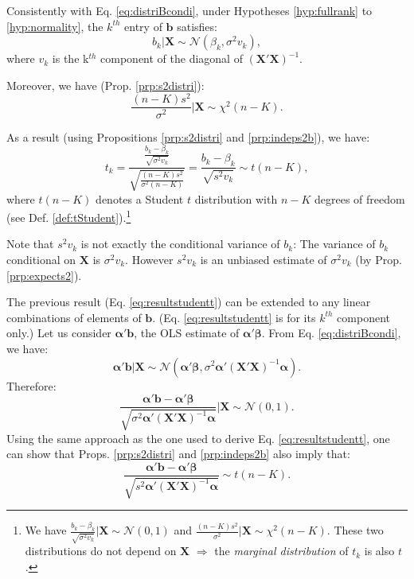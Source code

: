\documentclass[
  12pt,
]{book}
\theoremstyle{definition}
\theoremstyle{definition}
\theoremstyle{definition}
\theoremstyle{definition}
\theoremstyle{remark}
\begin{document}
Consistently with Eq. \eqref{eq:distriBcondi}, under Hypotheses \ref{hyp:fullrank} to \ref{hyp:normality}, the \(k^{th}\) entry of \(\mathbf{b}\) satisfies:
\[
b_k | \mathbf{X} \sim \mathcal{N}(\beta_k,\sigma^2 v_k),
\]
where \(v_k\) is the k\(^{th}\) component of the diagonal of \((\mathbf{X}'\mathbf{X})^{-1}\).

Moreover, we have (Prop. \ref{prp:s2distri}):
\[
\frac{(n-K)s^2}{\sigma^2} | \mathbf{X} \sim \chi ^2 (n-K).
\]

As a result (using Propositions \ref{prp:s2distri} and \ref{prp:indeps2b}), we have:
\begin{equation}
\boxed{t_k = \frac{\frac{b_k - \beta_k}{\sqrt{\sigma^2 v_k}}}{\sqrt{\frac{(n-K)s^2}{\sigma^2(n-K)}}} = \frac{b_k - \beta_k}{\sqrt{s^2v_k}} \sim t(n-K),}\label{eq:resultstudentt}
\end{equation}
where \(t(n-K)\) denotes a Student \(t\) distribution with \(n-K\) degrees of freedom (see Def. \ref{def:tStudent}).\footnote{We have \(\frac{b_k - \beta_k}{\sqrt{\sigma^2 v_k}} | \mathbf{X} \sim \mathcal{N}(0,1)\) and \(\frac{(n-K)s^2}{\sigma^2} | \mathbf{X} \sim \chi ^2 (n-K)\). These two distributions do not depend on \(\mathbf{X}\) \(\Rightarrow\) the \emph{marginal distribution} of \(t_k\) is also \(t\).}

Note that \(s^2 v_k\) is not exactly the conditional variance of \(b_k\): The variance of \(b_k\) conditional on \(\mathbf{X}\) is \(\sigma^2 v_k\). However \(s^2 v_k\) is an unbiased estimate of \(\sigma^2 v_k\) (by Prop. \ref{prp:expects2}).

The previous result (Eq. \eqref{eq:resultstudentt}) can be extended to any linear combinations of elements of \(\mathbf{b}\). (Eq. \eqref{eq:resultstudentt} is for its \(k^{th}\) component only.) Let us consider \(\boldsymbol\alpha'\mathbf{b}\), the OLS estimate of \(\boldsymbol\alpha'\boldsymbol\beta\). From Eq. \eqref{eq:distriBcondi}, we have:
\[
\boldsymbol\alpha'\mathbf{b} | \mathbf{X} \sim \mathcal{N}(\boldsymbol\alpha'\boldsymbol\beta,\sigma^2 \boldsymbol\alpha'(\mathbf{X}'\mathbf{X})^{-1}\boldsymbol\alpha).
\]
Therefore:
\[
\frac{\boldsymbol\alpha'\mathbf{b} - \boldsymbol\alpha'\boldsymbol\beta}{\sqrt{\sigma^2 \boldsymbol\alpha'(\mathbf{X}'\mathbf{X})^{-1}\boldsymbol\alpha}} | \mathbf{X} \sim \mathcal{N}(0,1).
\]
Using the same approach as the one used to derive Eq. \eqref{eq:resultstudentt}, one can show that Props. \ref{prp:s2distri} and \ref{prp:indeps2b} also imply that:
\begin{equation}
\boxed{\frac{\boldsymbol\alpha'\mathbf{b} - \boldsymbol\alpha'\boldsymbol\beta}{\sqrt{s^2\boldsymbol\alpha'(\mathbf{X}'\mathbf{X})^{-1}\boldsymbol\alpha}} \sim t(n-K).}\label{eq:resultstudentt2}
\end{equation}
\end{document}
